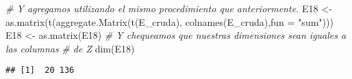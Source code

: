 \documentclass[
]{article}
\newenvironment{Shaded}{\begin{snugshade}}{\end{snugshade}}
\newcommand{\AttributeTok}[1]{\textcolor[rgb]{0.77,0.63,0.00}{#1}}
\newcommand{\CommentTok}[1]{\textcolor[rgb]{0.56,0.35,0.01}{\textit{#1}}}
\newcommand{\FunctionTok}[1]{\textcolor[rgb]{0.00,0.00,0.00}{#1}}
\newcommand{\NormalTok}[1]{#1}
\newcommand{\OtherTok}[1]{\textcolor[rgb]{0.56,0.35,0.01}{#1}}
\newcommand{\StringTok}[1]{\textcolor[rgb]{0.31,0.60,0.02}{#1}}
\begin{document}
\begin{Shaded}
\begin{Highlighting}[]
\CommentTok{\# Y agregamos utilizando el mismo procedimiento que anteriormente.}
\NormalTok{E18 }\OtherTok{\textless{}{-}} \FunctionTok{as.matrix}\NormalTok{(}\FunctionTok{t}\NormalTok{(}\FunctionTok{aggregate.Matrix}\NormalTok{(}\FunctionTok{t}\NormalTok{(E\_cruda), }\FunctionTok{colnames}\NormalTok{(E\_cruda),}\AttributeTok{fun =} \StringTok{"sum"}\NormalTok{)))}
\NormalTok{E18 }\OtherTok{\textless{}{-}} \FunctionTok{as.matrix}\NormalTok{(E18)}
\CommentTok{\# Y chequeamos que nuestras dimensiones sean iguales a las columnas}
\CommentTok{\# de Z}
\FunctionTok{dim}\NormalTok{(E18)}
\end{Highlighting}
\end{Shaded}

\begin{verbatim}
## [1]  20 136
\end{verbatim}
\end{document}

